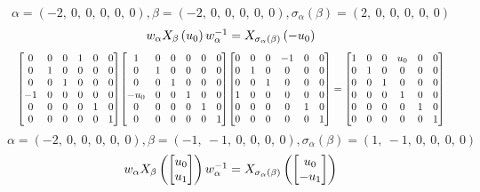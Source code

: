 \documentclass[11pt]{article}
\theoremstyle{definition}
\begin{document}
\providecommand{\scaletoalign}[2]{%
  \sbox0{$#2$}%
  \ifdim\wd0>#1\relax 
    \resizebox{#1}{!}{\usebox0}%
  \else 
    \usebox0%
  \fi 
}
\[
\alpha = \left( -2, \  0, \  0, \  0, \  0, \  0\right), \beta = \left( -2, \  0, \  0, \  0, \  0, \  0\right), \sigma_{\alpha}(\beta) = \left( 2, \  0, \  0, \  0, \  0, \  0\right)
\]
\[
\scaletoalign{\textwidth}{w_{\alpha} X_{\beta}\left(u_{0}\right) w_{\alpha}^{-1} = X_{\sigma_{\alpha}\left(\beta\right)}\left(- u_{0}\right)}
\]
\[
\scaletoalign{\textwidth}{{\left[\begin{matrix}0 & 0 & 0 & 1 & 0 & 0\\0 & 1 & 0 & 0 & 0 & 0\\0 & 0 & 1 & 0 & 0 & 0\\-1 & 0 & 0 & 0 & 0 & 0\\0 & 0 & 0 & 0 & 1 & 0\\0 & 0 & 0 & 0 & 0 & 1\end{matrix}\right]} {\left[\begin{matrix}1 & 0 & 0 & 0 & 0 & 0\\0 & 1 & 0 & 0 & 0 & 0\\0 & 0 & 1 & 0 & 0 & 0\\- u_{0} & 0 & 0 & 1 & 0 & 0\\0 & 0 & 0 & 0 & 1 & 0\\0 & 0 & 0 & 0 & 0 & 1\end{matrix}\right]} {\left[\begin{matrix}0 & 0 & 0 & -1 & 0 & 0\\0 & 1 & 0 & 0 & 0 & 0\\0 & 0 & 1 & 0 & 0 & 0\\1 & 0 & 0 & 0 & 0 & 0\\0 & 0 & 0 & 0 & 1 & 0\\0 & 0 & 0 & 0 & 0 & 1\end{matrix}\right]} = {\left[\begin{matrix}1 & 0 & 0 & u_{0} & 0 & 0\\0 & 1 & 0 & 0 & 0 & 0\\0 & 0 & 1 & 0 & 0 & 0\\0 & 0 & 0 & 1 & 0 & 0\\0 & 0 & 0 & 0 & 1 & 0\\0 & 0 & 0 & 0 & 0 & 1\end{matrix}\right]}}
\]
\[
\alpha = \left( -2, \  0, \  0, \  0, \  0, \  0\right), \beta = \left( -1, \  -1, \  0, \  0, \  0, \  0\right), \sigma_{\alpha}(\beta) = \left( 1, \  -1, \  0, \  0, \  0, \  0\right)
\]
\[
\scaletoalign{\textwidth}{w_{\alpha} X_{\beta}\left(\left[\begin{matrix}u_{0}\\u_{1}\end{matrix}\right]\right) w_{\alpha}^{-1} = X_{\sigma_{\alpha}\left(\beta\right)}\left(\left[\begin{matrix}u_{0}\\- u_{1}\end{matrix}\right]\right)}
\]
\end{document}
